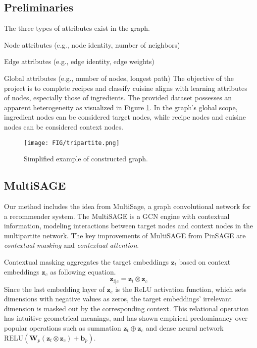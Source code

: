 \subsection{Preliminaries}

The three types of attributes exist in the graph.
\bit
    \item Node attributes (e.g., node identity, number of neighbors)
    \item Edge attributes (e.g., edge identity, edge weights)
    \item Global attributes (e.g., number of nodes, longest path)
\eit
The objective of the project is to complete recipes and classify cuisine aligns with learning attributes of nodes, especially those of ingredients.
The provided dataset possesses an apparent heterogeneity as visualized in Figure \ref{fig:tripartite}.
In the graph's global scope, ingredient nodes can be considered target nodes, while recipe nodes and cuisine nodes can be considered context nodes.

\begin{figure}[btp!]
    \centering
    \texttt{[image: FIG/tripartite.png]}
    \caption{\label{fig:tripartite}Simplified example of constructed graph.}
\end{figure}

\subsection{MultiSAGE}

Our method includes the idea from MultiSage, a graph convolutional network for a recommender system.
The MultiSAGE\cite{yang2020multisage} is a GCN engine with contextual information, modeling interactions between target nodes and context nodes in the multipartite network.
The key improvements of MultiSAGE from PinSAGE are \emph{contextual masking} and \emph{contextual attention}.

Contextual masking aggregates the target embeddings $\mathbf{z}_t$ based on context embeddings $\mathbf{z}_c$ as following equation.
\begin{equation}
    \mathbf{z}_{t|c} = \mathbf{z}_t \otimes \mathbf{z}_c
\end{equation}
Since the last embedding layer of $\mathbf{z}_c$ is the ReLU activation function, which sets dimensions with negative values as zeros, the target embeddings' irrelevant dimension is masked out by the corresponding context. This relational operation has intuitive geometrical meanings, and has shown empirical predominancy over popular operations such as summation $\mathbf{z}_t \oplus \mathbf{z}_c$ and dense neural network $\text{RELU}(\mathbf{W}_p(\mathbf{z}_t \otimes \mathbf{z}_c) + \mathbf{b}_p)$.

